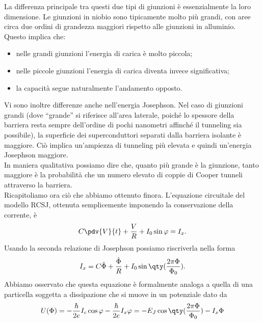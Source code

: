 \normalsize
\hspace{-0.6cm}La differenza principale tra questi due tipi di giunzioni è essenzialmente la loro dimensione. Le giunzioni in niobio sono tipicamente molto più grandi, con aree circa due ordini di grandezza maggiori rispetto alle giunzioni in alluminio.\\
Questo implica che:
\begin{itemize}[leftmargin=0.5cm]
    \item nelle grandi giunzioni l'energia di carica è molto piccola;
    \item nelle piccole giunzioni l'energia di carica diventa invece significativa;
    \item la capacità segue naturalmente l'andamento opposto.
\end{itemize}
Vi sono inoltre differenze anche nell'energia Josephson. Nel caso di giunzioni grandi (dove ``grande'' si riferisce all'area laterale, poiché lo spessore della barriera resta sempre dell'ordine di pochi nanometri affinché il tunneling sia possibile), la superficie dei superconduttori separati dalla barriera isolante è maggiore. Ciò implica un'ampiezza di tunneling più elevata e quindi un'energia Josephson maggiore.\\
In maniera qualitativa possiamo dire che, quanto più grande è la giunzione, tanto maggiore è la probabilità che un numero elevato di coppie di Cooper tunneli attraverso la barriera.\\
Ricapitoliamo ora ciò che abbiamo ottenuto finora. L'equazione circuitale del modello RCSJ, ottenuta semplicemente imponendo la conservazione della corrente, è
\begin{equation*}
    C \pdv{V}{t}
    +
    \frac{V}{R}
    +
    I_0 \sin{\varphi}
    =
    I_x.
\end{equation*}
Usando la seconda relazione di Josephson possiamo riscriverla nella forma
\begin{equation*}
    I_x
    =
    C \ddot{\Phi}
    +
    \frac{\dot{\Phi}}{R}
    +
    I_0
    \sin{
        \qty(
            \frac{2\pi\Phi}{\Phi_0}
        )
    }.
\end{equation*}
Abbiamo osservato che questa equazione è formalmente analoga a quella di una particella soggetta a dissipazione che si muove in un potenziale dato da
\begin{equation*}
    U(\Phi)
    = - \frac{\hbar}{2e} I_c \cos{\varphi} - \frac{\hbar}{2e} I_x \varphi
    = - E_J \cos{ \qty( \frac{2\pi\Phi}{\Phi_0} ) } - I_x\Phi
\end{equation*}
